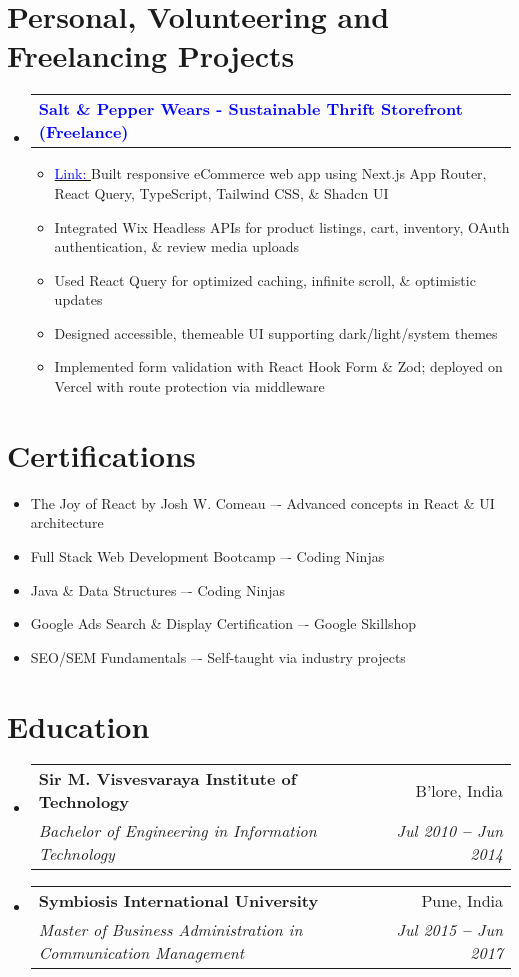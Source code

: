 \documentclass[letterpaper,11pt]{article}
\makeatletter
\newcommand{\resumeItem}[1]{
  \item\footnotesize{
    {#1 \vspace{-2pt}}
  }
}
\newcommand{\resumeSubheading}[4]{
  \vspace{-2pt}\item
    \begin{tabular*}{0.97\textwidth}[t]{l@{\extracolsep{\fill}}r}
      \small\textbf{#1} & \footnotesize #2 \\
      \textit{\footnotesize#3} & \textit{\footnotesize #4} \\
    \end{tabular*}\vspace{-5pt}
}
\newcommand{\resumeProjectHeading}[2]{
    \vspace{-2pt}\item
    \begin{tabular*}{0.97\textwidth}{l@{\extracolsep{\fill}}r}
      \small#1 & #2 \\
    \end{tabular*}\vspace{-7pt}
}
\newcommand{\resumeSubHeadingListStart}{\begin{itemize}[leftmargin=0.15in, label={}]}
\newcommand{\resumeSubHeadingListEnd}{\end{itemize}}
\newcommand{\resumeItemListStart}{\begin{itemize}}
\newcommand{\resumeItemListEnd}{\end{itemize}\vspace{-10pt}}
\makeatother
\begin{document}

\section{Personal, Volunteering and Freelancing Projects}
\vspace{3pt}
\resumeSubHeadingListStart

\resumeProjectHeading
{\textbf{\textcolor{blue}{Salt \& Pepper Wears - Sustainable Thrift Storefront (Freelance)}}}{}

\resumeItemListStart
\resumeItem{{\href{https://saltandpepper.vercel.app/}{\textcolor{blue}{Link: }}}Built responsive eCommerce web app using Next.js App Router, React Query, TypeScript, Tailwind CSS, \& Shadcn UI}
\resumeItem{Integrated Wix Headless APIs for product listings, cart, inventory, OAuth authentication, \& review media uploads}
\resumeItem{Used React Query for optimized caching, infinite scroll, \& optimistic updates}
\resumeItem{Designed accessible, themeable UI supporting dark/light/system themes}
\resumeItem{Implemented form validation with React Hook Form \& Zod; deployed on Vercel with route protection via middleware}
\resumeItemListEnd


\resumeSubHeadingListEnd



\section{Certifications}
\vspace{2pt}
\resumeSubHeadingListStart
\small{\item{
              \resumeItemListStart
              \resumeItem{The Joy of React by Josh W. Comeau –- Advanced concepts in React \& UI architecture}
              \resumeItem{Full Stack Web Development Bootcamp –- Coding Ninjas}
              \resumeItem{Java \& Data Structures –- Coding Ninjas}
              \resumeItem{Google Ads Search \& Display Certification –- Google Skillshop}
              \resumeItem{SEO/SEM Fundamentals –- Self-taught via industry projects}
              \resumeItemListEnd
        }}
\resumeSubHeadingListEnd





\section{Education}
\vspace{3pt}
\resumeSubHeadingListStart
\resumeSubheading
{Sir M. Visvesvaraya Institute of Technology}{B'lore, India}
{Bachelor of  Engineering in Information Technology}{Jul 2010 \textbf{--} Jun 2014}
\resumeSubheading
{Symbiosis International University}{Pune, India}
{Master of Business Administration in Communication Management}{Jul 2015 \textbf{--} Jun 2017}
\resumeSubHeadingListEnd

\end{document}
